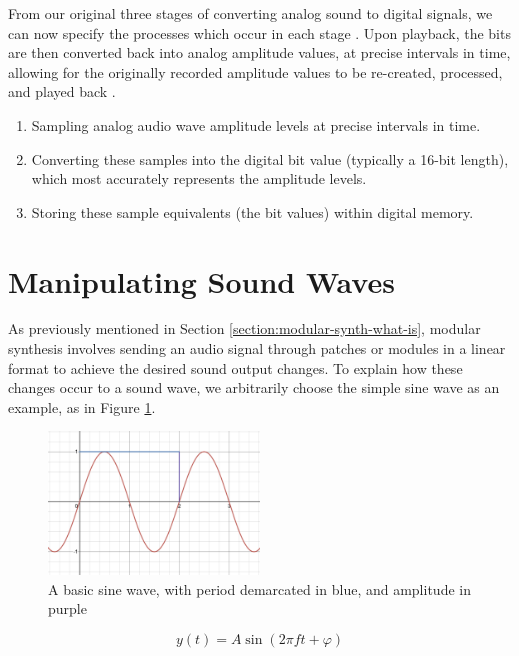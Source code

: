 From our original three stages of converting analog sound to digital signals, we can now specify the processes which occur in each stage \cite{Huber_Runstein_2018}. Upon playback, the bits are then converted back into analog amplitude values, at precise intervals in time, allowing for the originally recorded amplitude values to be re-created, processed, and played back \cite{Huber_Runstein_2018}. 

\begin{enumerate}
	\item Sampling analog audio wave amplitude levels at precise intervals in time.
	\item Converting these samples into the digital bit value (typically a 16-bit length), which most accurately represents the amplitude levels.
	\item Storing these sample equivalents (the bit values) within digital memory.
\end{enumerate}


\section{Manipulating Sound Waves}\label{section:manip-waves}
As previously mentioned in Section \ref{section:modular-synth-what-is}, modular synthesis involves sending an audio signal through patches or modules in a linear format to achieve the desired sound output changes. To explain how these changes occur to a sound wave, we arbitrarily choose the simple sine wave as an example, as in Figure \ref{fig:sine-wave-period-amplitude}. 

\begin{figure}[H]
	\centering
	\includegraphics[width=0.5\textwidth]{figures/sine-wave-period-amplitude.png}
	\caption{A basic sine wave, with period demarcated in blue, and amplitude in purple}
	\label{fig:sine-wave-period-amplitude}
\end{figure}

\begin{equation}\label{eq:full-sine-wave-equation}
	y(t) = A \sin(2\pi ft + \varphi)
\end{equation}

